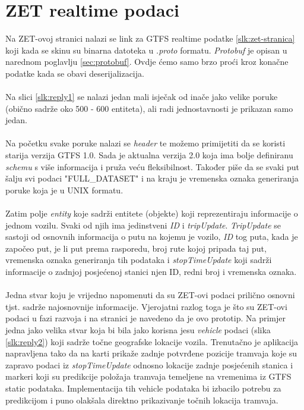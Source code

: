 \documentclass[zavrsnirad]{fer}
\begin{document}
\section{ZET realtime podaci}
Na ZET-ovoj stranici nalazi se link za GTFS realtime podatke \ref{slk:zet-stranica} koji kada se skinu su binarna datoteka u \textit{.proto} formatu. \textit{Protobuf} je opisan u narednom poglavlju \ref{sec:protobuf}. Ovdje ćemo samo brzo proći kroz konačne podatke kada se obavi deserijalizacija.\\\\
Na slici \ref{slk:reply1} se nalazi jedan mali isječak od inače jako velike poruke (obično sadrže oko 500 - 600 entiteta), ali radi jednostavnosti je prikazan samo jedan.\\\\
Na početku svake poruke nalazi se \textit{header} te možemo primijetiti da se koristi starija verzija GTFS 1.0. Sada je aktualna verzija 2.0 koja ima bolje definiranu \textit{schemu} s više informacija i pruža veću fleksibilnost. Također piše da se svaki put šalju svi podaci "FULL\_DATASET" i na kraju je vremenska oznaka generiranja poruke koja je u UNIX formatu.\\\\
Zatim polje \textit{entity} koje sadrži entitete (objekte) koji reprezentiraju informacije o jednom vozilu. Svaki od njih ima jedinstveni \textit{ID} i \textit{tripUpdate}. \textit{TripUpdate} se sastoji od osnovnih informacija o putu na kojemu je vozilo, \textit{ID} tog puta, kada je započeo put, je li put prema rasporedu, broj rute kojoj pripada taj put, vremenska oznaka generiranja tih podataka i \textit{stopTimeUpdate} koji sadrži informacije o zadnjoj posjećenoj stanici njen ID, redni broj i vremenska oznaka.\\\\
Jedna stvar koju je vrijedno napomenuti da su ZET-ovi podaci prilično osnovni tjst. sadrže najosnovnije informacije. Vjerojatni razlog toga je što su ZET-ovi podaci u fazi razvoja i na stranici je navedeno da je ovo prototip. Na primjer jedna jako velika stvar koja bi bila jako korisna jesu \textit{vehicle} podaci (slika \ref{slk:reply2}) koji sadrže točne geografske lokacije vozila. Trenutačno je aplikacija napravljena tako da na karti prikaže zadnje potvrđene pozicije tramvaja koje su zapravo podaci iz \textit{stopTimeUpdate} odnosno lokacije zadnje posjećenih stanica i markeri koji su predikcije položaja tramvaja temeljene na vremenima iz GTFS static podataka. Implementacija tih vehicle podataka bi izbacilo potrebu za predikcijom i puno olakšala direktno prikazivanje točnih lokacija tramvaja.
\end{document}
